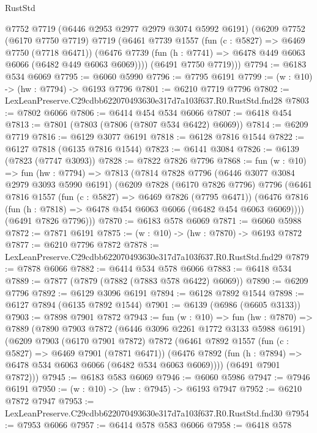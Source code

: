 \begin{lexlean}{RustStd}
\begin{coremodule}
      @7752
      @7719
      (@6446 @2953 @2977 @2979 @3074 @5992 @6191)
      (@6209
        @7752
        (@6170 @7750 @7719)
        @7719
        (@6461
          @7739
          @1557
          (fun (c : @5827) => @6469 @7750 (@7718 @6471))
          (@6476 @7739 (fun (h : @7741) => @6478 @449 @6063 @6066 (@6482 @449 @6063 @6069))))
        (@6491 @7750 @7719)))
@7794 := @6183 @534 @6069
@7795 := @6060 @5990
@7796 := @7795 @6191
@7799 := (w : @10) -> (hw : @7794) -> @6193 @7796
@7801 := @6210 @7719 @7796
@7802 := LexLeanPreserve.C29cdbb622070493630e317d7a103f637.R0.RustStd.fnd28
@7803 := @7802 @6066
@7806 := @6414 @454 @534 @6066
@7807 := @6418 @454
@7813 := @7801 (@7803 (@7806 (@7807 @534 @6422) @6069))
@7814 := @6209 @7719
@7816 := @6129 @3077 @6191
@7818 := @6128 @7816 @1544
@7822 := @6127 @7818 (@6135 @7816 @1544)
@7823 := @6141 @3084
@7826 := @6139 (@7823 (@7747 @3093))
@7828 := @7822 @7826 @7796
@7868 := fun (w : @10) =>
  fun (hw : @7794) =>
  @7813
    (@7814
      @7828
      @7796
      (@6446 @3077 @3084 @2979 @3093 @5990 @6191)
      (@6209
        @7828
        (@6170 @7826 @7796)
        @7796
        (@6461
          @7816
          @1557
          (fun (c : @5827) => @6469 @7826 (@7795 @6471))
          (@6476 @7816 (fun (h : @7818) => @6478 @454 @6063 @6066 (@6482 @454 @6063 @6069))))
        (@6491 @7826 @7796)))
@7870 := @6183 @578 @6069
@7871 := @6060 @5988
@7872 := @7871 @6191
@7875 := (w : @10) -> (hw : @7870) -> @6193 @7872
@7877 := @6210 @7796 @7872
@7878 := LexLeanPreserve.C29cdbb622070493630e317d7a103f637.R0.RustStd.fnd29
@7879 := @7878 @6066
@7882 := @6414 @534 @578 @6066
@7883 := @6418 @534
@7889 := @7877 (@7879 (@7882 (@7883 @578 @6422) @6069))
@7890 := @6209 @7796
@7892 := @6129 @3096 @6191
@7894 := @6128 @7892 @1544
@7898 := @6127 @7894 (@6135 @7892 @1544)
@7901 := @6139 (@6986 (@6605 @3133))
@7903 := @7898 @7901 @7872
@7943 := fun (w : @10) =>
  fun (hw : @7870) =>
  @7889
    (@7890
      @7903
      @7872
      (@6446 @3096 @2261 @1772 @3133 @5988 @6191)
      (@6209
        @7903
        (@6170 @7901 @7872)
        @7872
        (@6461
          @7892
          @1557
          (fun (c : @5827) => @6469 @7901 (@7871 @6471))
          (@6476 @7892 (fun (h : @7894) => @6478 @534 @6063 @6066 (@6482 @534 @6063 @6069))))
        (@6491 @7901 @7872)))
@7945 := @6183 @583 @6069
@7946 := @6060 @5986
@7947 := @7946 @6191
@7950 := (w : @10) -> (hw : @7945) -> @6193 @7947
@7952 := @6210 @7872 @7947
@7953 := LexLeanPreserve.C29cdbb622070493630e317d7a103f637.R0.RustStd.fnd30
@7954 := @7953 @6066
@7957 := @6414 @578 @583 @6066
@7958 := @6418 @578

\end{coremodule}
\end{lexlean}
